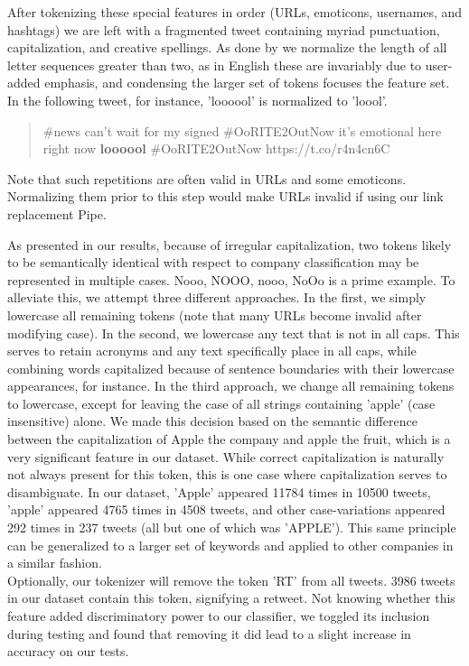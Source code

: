 \documentclass[letterpaper]{article}
\begin{document}
After tokenizing these special features in order (URLs, emoticons, usernames, and hashtags) we are left with a fragmented tweet containing myriad punctuation, capitalization, and creative spellings. As done by \citet{potts2011} we normalize the length of all letter sequences greater than two, as in English these are invariably due to user-added emphasis, and condensing the larger set of tokens focuses the feature set. In the following tweet, for instance, 'loooool' is normalized to 'loool'.
\begin{quote}
\#news can't wait for my signed \#OoRITE2OutNow it's emotional here right now \textbf{loooool} \#OoRITE2OutNow https://t.co/r4n4cn6C 
\end{quote}

Note that such repetitions are often valid in URLs and some emoticons. Normalizing them prior to this step would make URLs invalid if using our link replacement Pipe.

As presented in our results, because of irregular capitalization, two tokens likely to be semantically identical with respect to company classification may be represented in multiple cases. {Nooo, NOOO, nooo, NoOo} is a prime example. To alleviate this, we attempt three different approaches. In the first, we simply lowercase all remaining tokens (note that many URLs become invalid after modifying case). In the second, we lowercase any text that is not in all caps. This serves to retain acronyms and any text specifically place in all caps, while combining words capitalized because of sentence boundaries with their lowercase appearances, for instance. In the third approach, we change all remaining tokens to lowercase, except for leaving the case of all strings containing 'apple' (case insensitive) alone. We made this decision based on the semantic difference between the capitalization of Apple the company and apple the fruit, which is a very significant feature in our dataset. While correct capitalization is naturally not always present for this token, this is one case where capitalization serves to disambiguate. In our dataset, 'Apple' appeared 11784 times in 10500 tweets, 'apple' appeared 4765 times in 4508 tweets, and other case-variations appeared 292 times in 237 tweets (all but one of which was 'APPLE'). This same principle can be generalized to a larger set of keywords and applied to other companies in a similar fashion. \\

Optionally, our tokenizer will remove the token 'RT' from all tweets. 3986 tweets in our dataset contain this token, signifying a retweet. Not knowing whether this feature added discriminatory power to our classifier, we toggled its inclusion during testing and found that removing it did lead to a slight increase in accuracy on our tests.\\
\end{document}
